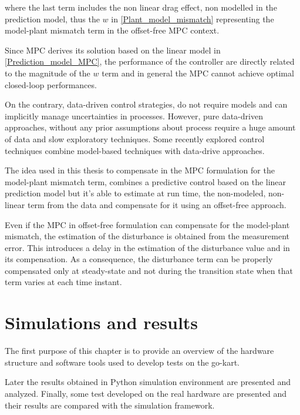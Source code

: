\documentclass[a4paper,12pt,oneside]{book}
\begin{document}
where the last term includes the non linear drag effect, non modelled in the prediction model, thus the $w$ in \ref{Plant_model_mismatch} representing the model-plant mismatch term in the offset-free MPC context.

Since MPC derives its solution based on the linear model in \ref{Prediction_model_MPC}, the performance of the controller are directly related to the magnitude of the $w$ term and in general the MPC cannot achieve optimal closed-loop performances.

On the contrary, data-driven control strategies, do not require models and can implicitly manage uncertainties in processes. However, pure data-driven approaches, without any prior assumptions about process require a huge amount of data and slow exploratory techniques.
Some recently explored control techniques combine model-based techniques with data-drive approaches. 

\bigskip
The idea used in this thesis to compensate in the MPC formulation for the model-plant mismatch term, combines a predictive control based on the linear prediction model but it's able to estimate at run time, the non-modeled, non-linear term from the data and compensate for it using an offset-free approach.

Even if the MPC in offset-free formulation can compensate for the model-plant mismatch, the estimation of the disturbance is obtained from the measurement error. 
This introduces a delay in the estimation of the disturbance value and in its compensation.
As a consequence, the disturbance term can be properly compensated only at steady-state and not during the transition state when that term varies at each time instant. 








\chapter{Simulations and results}
\label{chapter:Simulations_and_Hardware_results}
The first purpose of this chapter is to provide an overview of the hardware structure and software tools used to develop tests on the go-kart.

Later the results obtained in Python simulation environment are presented and analyzed.
Finally, some test developed on the real hardware are presented and their results are compared with the simulation framework.
\end{document}
